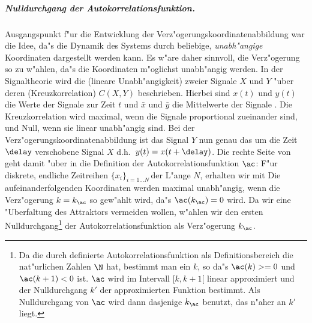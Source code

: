 \subparagraph{Nulldurchgang der Autokorrelationsfunktion.} Ausgangspunkt f"ur die
Entwicklung der Verz"ogerungskoordinatenabbildung war die Idee, da"s die Dynamik des
Systems durch beliebige, \emph{unabh"angige} Koordinaten dargestellt werden kann. Es w"are
daher sinnvoll, die Verz"ogerung so zu w"ahlen, da"s die Koordinaten m"oglichst
unabh"angig werden. In der Signaltheorie wird die \begriff(lineare Unabh"angigkeit) zweier
Signale $X$ und $Y$ "uber deren \begriff(Kreuzkorrelation) $C(X,Y)$ beschrieben.
Hierbei sind $x(t)$ und $y(t)$ die Werte der Signale zur
Zeit $t$ und $\bar x$ und $\bar y$ die Mittelwerte der Signale \footnotemark. Die
Kreuzkorrelation wird maximal, wenn die Signale proportional zueinander sind, und Null,
wenn sie linear unabh"angig sind. Bei der Verz"ogerungskoordinatenabbildung ist das Signal
$Y$ nun genau das um die Zeit $\delay$ verschobene Signal $X$ d.h.\ $y(t)=x(t+\delay)$.
Die rechte Seite von  geht damit "uber in die Definition der
Autokorrelationsfunktion $\ac$: 
 F"ur diskrete, endliche Zeitreihen
$\{x_i\}_{i=1\dots N}\,$der L"ange $N$, erhalten wir
mit
 Die aufeinanderfolgenden Koordinaten
werden maximal unabh"angig, wenn die Verz"ogerung $k=k_\ac$ so gew"ahlt wird, da"s
$\ac(k_\ac)=0$ wird. Da wir eine "Uberfaltung des Attraktors vermeiden wollen, w"ahlen wir
den ersten Nulldurchgang\footnote{Da die durch  definierte
  Autokorrelationsfunktion als Definitionsbereich die nat"urlichen Zahlen $\N$ hat,
  bestimmt man ein $k$, so da"s $\ac(k)>=0$ und $\ac(k+1)<0$ ist. $\ac$ wird im Intervall
  $[k,k+1[$ linear approximiert und der Nulldurchgang $k'$ der approximierten Funktion
  bestimmt. Als Nulldurchgang von $\ac$ wird dann dasjenige $k_\ac$ benutzt, das n"aher an
  $k'$ liegt.}  der Autokorrelationsfunktion als Verz"ogerung $k_\ac$. 

